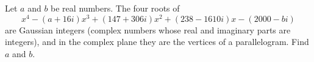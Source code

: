 Let $a$ and $b$ be real numbers. The four roots of
\[x^4-(a+16i)x^3+(147+306i)x^2+(238-1610i)x-(2000-bi)\]
are Gaussian integers (complex numbers whose real and imaginary parts are integers), and in the complex plane they are the vertices of a parallelogram. Find $a$ and $b$.
